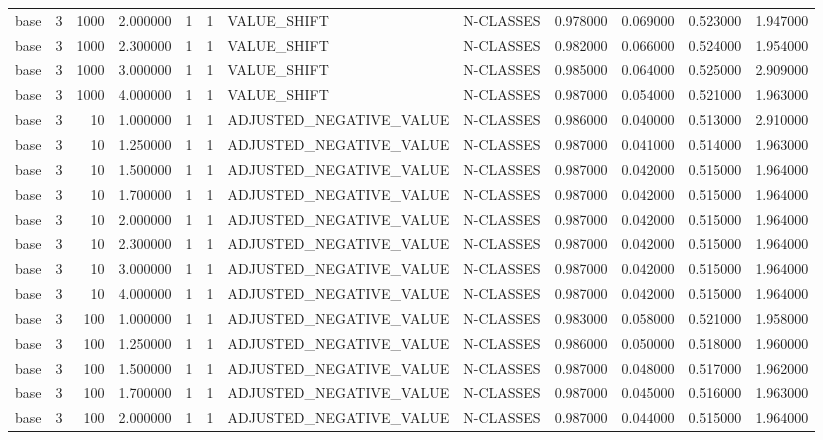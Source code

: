 \begin{tabular}{lrrrllllrrrr}
base & 3 & 1000 & 2.000000 & 1 & 1 & VALUE_SHIFT & N-CLASSES & 0.978000 & 0.069000 & 0.523000 & 1.947000 \\
base & 3 & 1000 & 2.300000 & 1 & 1 & VALUE_SHIFT & N-CLASSES & 0.982000 & 0.066000 & 0.524000 & 1.954000 \\
base & 3 & 1000 & 3.000000 & 1 & 1 & VALUE_SHIFT & N-CLASSES & 0.985000 & 0.064000 & 0.525000 & 2.909000 \\
base & 3 & 1000 & 4.000000 & 1 & 1 & VALUE_SHIFT & N-CLASSES & 0.987000 & 0.054000 & 0.521000 & 1.963000 \\
base & 3 & 10 & 1.000000 & 1 & 1 & ADJUSTED_NEGATIVE_VALUE & N-CLASSES & 0.986000 & 0.040000 & 0.513000 & 2.910000 \\
base & 3 & 10 & 1.250000 & 1 & 1 & ADJUSTED_NEGATIVE_VALUE & N-CLASSES & 0.987000 & 0.041000 & 0.514000 & 1.963000 \\
base & 3 & 10 & 1.500000 & 1 & 1 & ADJUSTED_NEGATIVE_VALUE & N-CLASSES & 0.987000 & 0.042000 & 0.515000 & 1.964000 \\
base & 3 & 10 & 1.700000 & 1 & 1 & ADJUSTED_NEGATIVE_VALUE & N-CLASSES & 0.987000 & 0.042000 & 0.515000 & 1.964000 \\
base & 3 & 10 & 2.000000 & 1 & 1 & ADJUSTED_NEGATIVE_VALUE & N-CLASSES & 0.987000 & 0.042000 & 0.515000 & 1.964000 \\
base & 3 & 10 & 2.300000 & 1 & 1 & ADJUSTED_NEGATIVE_VALUE & N-CLASSES & 0.987000 & 0.042000 & 0.515000 & 1.964000 \\
base & 3 & 10 & 3.000000 & 1 & 1 & ADJUSTED_NEGATIVE_VALUE & N-CLASSES & 0.987000 & 0.042000 & 0.515000 & 1.964000 \\
base & 3 & 10 & 4.000000 & 1 & 1 & ADJUSTED_NEGATIVE_VALUE & N-CLASSES & 0.987000 & 0.042000 & 0.515000 & 1.964000 \\
base & 3 & 100 & 1.000000 & 1 & 1 & ADJUSTED_NEGATIVE_VALUE & N-CLASSES & 0.983000 & 0.058000 & 0.521000 & 1.958000 \\
base & 3 & 100 & 1.250000 & 1 & 1 & ADJUSTED_NEGATIVE_VALUE & N-CLASSES & 0.986000 & 0.050000 & 0.518000 & 1.960000 \\
base & 3 & 100 & 1.500000 & 1 & 1 & ADJUSTED_NEGATIVE_VALUE & N-CLASSES & 0.987000 & 0.048000 & 0.517000 & 1.962000 \\
base & 3 & 100 & 1.700000 & 1 & 1 & ADJUSTED_NEGATIVE_VALUE & N-CLASSES & 0.987000 & 0.045000 & 0.516000 & 1.963000 \\
base & 3 & 100 & 2.000000 & 1 & 1 & ADJUSTED_NEGATIVE_VALUE & N-CLASSES & 0.987000 & 0.044000 & 0.515000 & 1.964000 \\

\end{tabular}
